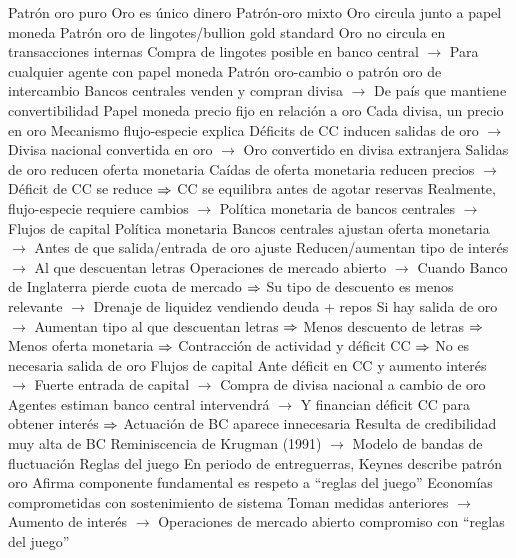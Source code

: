 \documentclass{nuevotema}
\begin{document}
\begin{esquemal}
				\4 Patrón oro puro
				\4[] Oro es único dinero
				\4 Patrón-oro mixto
				\4[] Oro circula junto a papel moneda
				\4 Patrón oro de lingotes/bullion gold standard
				\4[] Oro no circula en transacciones internas
				\4[] Compra de lingotes posible en banco central
				\4[] $\to$ Para cualquier agente con papel moneda
				\4 Patrón oro-cambio o patrón oro de intercambio
				\4[] Bancos centrales venden y compran divisa
				\4[] $\to$ De país que mantiene convertibilidad
				\4 Papel moneda precio fijo en relación a oro
				\4 Cada divisa, un precio en oro
				\4 Mecanismo flujo-especie explica
				\4[] Déficits de CC inducen salidas de oro
				\4[] $\to$ Divisa nacional convertida en oro
				\4[] $\to$ Oro convertido en divisa extranjera
				\4[] Salidas de oro reducen oferta monetaria
				\4[] Caídas de oferta monetaria reducen precios
				\4[] $\to$ Déficit de CC se reduce
				\4[] $\Rightarrow$ CC se equilibra antes de agotar reservas
				\4 Realmente, flujo-especie requiere cambios
				\4[] $\to$ Política monetaria de bancos centrales
				\4[] $\to$ Flujos de capital
				\4 Política monetaria
				\4[] Bancos centrales ajustan oferta monetaria
				\4[] $\to$ Antes de que salida/entrada de oro ajuste
				\4[] Reducen/aumentan tipo de interés
				\4[] $\to$ Al que descuentan letras
				\4[] Operaciones de mercado abierto
				\4[] $\to$ Cuando Banco de Inglaterra pierde cuota de mercado
				\4[] $\Rightarrow$ Su tipo de descuento es menos relevante
				\4[] $\to$ Drenaje de liquidez vendiendo deuda + repos
				\4[] Si hay salida de oro
				\4[] $\to$ Aumentan tipo al que descuentan letras
				\4[] $\Rightarrow$ Menos descuento de letras
				\4[] $\Rightarrow$ Menos oferta monetaria
				\4[] $\Rightarrow$ Contracción de actividad y déficit CC
				\4[] $\Rightarrow$ No es necesaria salida de oro
				\4 Flujos de capital
				\4[] Ante déficit en CC y aumento interés
				\4[] $\to$ Fuerte entrada de capital
				\4[] $\to$ Compra de divisa nacional a cambio de oro
				\4[] Agentes estiman banco central intervendrá
				\4[] $\to$ Y financian déficit CC para obtener interés
				\4[] $\Rightarrow$ Actuación de BC aparece innecesaria
				\4[] Resulta de credibilidad muy alta de BC
				\4[] Reminiscencia de Krugman (1991)
				\4[] $\to$ Modelo de bandas de fluctuación
			\3 Reglas del juego
				\4 En periodo de entreguerras, Keynes describe patrón oro
				\4 Afirma componente fundamental es respeto a ``reglas del juego''
				\4 Economías comprometidas con sostenimiento de sistema
				\4 Toman medidas anteriores
				\4[] $\to$ Aumento de interés
				\4[] $\to$ Operaciones de mercado abierto
				\4 compromiso con ``reglas del juego''

\end{esquemal}
\end{document}

